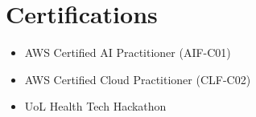 \documentclass[a4paper,9pt]{article} %
\begin{document}
\section*{Certifications }

\begin{itemize}[left=0pt, itemsep=0pt]
    \item AWS Certified AI Practitioner (AIF-C01)
    \item AWS Certified Cloud Practitioner (CLF-C02)
    \item UoL Health Tech Hackathon
\end{itemize}


\end{document}

